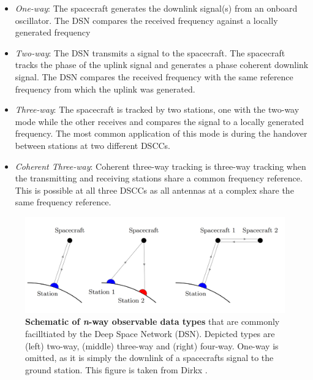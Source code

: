 \begin{itemize}
    \item \textit{One-way}: The spacecraft generates the downlink signal(s) from an
          onboard oscillator. The DSN compares the received frequency against a
          locally generated frequency
    \item \textit{Two-way}: The DSN transmits a signal to the spacecraft. The spacecraft
          tracks the phase of the uplink signal and generates a phase coherent
          downlink signal. The DSN compares the received frequency with the same
          reference frequency from which the uplink was generated.
    \item \textit{Three-way}: The spacecraft is tracked by two stations, one with the
          two-way mode while the other receives and compares the signal to a locally
          generated frequency. The most common application of this mode is during the
          handover between stations at two different DSCCs.
    \item \textit{Coherent Three-way}: Coherent three-way tracking is three-way tracking
          when the transmitting and receiving stations share a common frequency
          reference. This is possible at all three DSCCs as all antennas at a
          complex share the same frequency reference.
\end{itemize}

\begin{figure}[h]
    \centering
    \includegraphics[width=0.85\linewidth]{graphics/n-way.PNG}
    \caption{
        \textbf{Schematic of \textit{n}-way observable data types} that are
        commonly facilltiated by the Deep Space Network (DSN). Depicted types
        are (left) two-way, (middle) three-way and (right) four-way. One-way is
        omitted, as it is simply the downlink of a spacecrafts signal to the
        ground station. This figure is taken from Dirkx \cite{Dirkx2015}.
    }
    \label{fig:n-way}
\end{figure}



